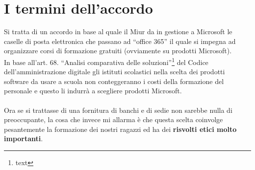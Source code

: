 \documentclass[]{article}
\begin{document}
\section{I termini dell'accordo}
Si tratta di un accordo in base al quale il Miur da in gestione a Microsoft le caselle di posta elettronica che passano ad “office 365” il quale si impegna ad organizzare corsi di formazione gratuiti (ovviamente su prodotti Microsoft).
\\In base all’art. 68. “Analisi comparativa delle soluzioni”\footnote{text} del  Codice dell’amministrazione digitale  gli istituti scolastici nella scelta dei prodotti software da usare a scuola non conteggeranno i costi della formazione del personale e questo li indurrà a scegliere prodotti Microsoft. 
\\\\
Ora se si trattasse di una fornitura di banchi e di sedie non sarebbe nulla di preoccupante, la cosa che invece mi allarma è che questa scelta coinvolge pesantemente la formazione dei nostri ragazzi ed ha dei \textbf{risvolti etici molto importanti}.
\end{document}
